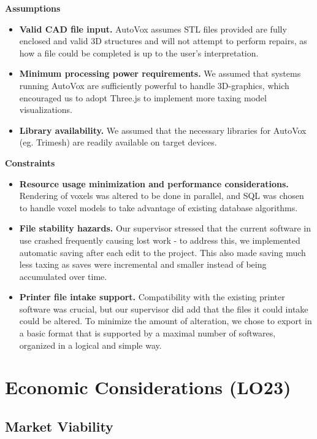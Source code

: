 \documentclass[12pt, titlepage]{article}
\begin{document}
\noindent\textbf{Assumptions}
\begin{itemize}
  \item\textbf{Valid CAD file input.} AutoVox assumes STL files provided are fully enclosed and valid 
  3D structures and will not attempt to perform repairs, as how a file could be completed is up to the
  user's interpretation.
  \item\textbf{Minimum processing power requirements.} We assumed that systems running AutoVox are 
  sufficiently powerful to handle 3D-graphics, which encouraged us to adopt Three.js to implement more
  taxing model visualizations.
  \item\textbf{Library availability.} We assumed that the necessary libraries for AutoVox (eg. Trimesh)
  are readily available on target devices.
\end{itemize}

\noindent\textbf{Constraints}
\begin{itemize}
  \item\textbf{Resource usage minimization and performance considerations.} Rendering of voxels was altered
  to be done in parallel, and SQL was chosen to handle voxel models to take advantage of existing database 
  algorithms.
  \item\textbf{File stability hazards.} Our supervisor stressed that the current software in use crashed 
  frequently causing lost work - to address this, we implemented automatic saving after each edit to the 
  project. This also made saving much less taxing as saves were incremental and smaller instead of being
  accumulated over time.
  \item\textbf{Printer file intake support.} Compatibility with the existing printer software was crucial, but
  our supervisor did add that the files it could intake could be altered. To minimize the amount of alteration,
  we chose to export in a basic format that is supported by a maximal number of softwares, organized in a 
  logical and simple way.
\end{itemize}

\section{Economic Considerations (LO23)}

\subsection{Market Viability}
\end{document}
